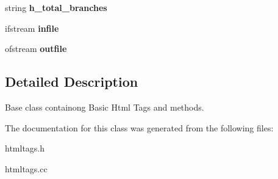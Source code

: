 \begin{DoxyCompactItemize}
\item 
\hypertarget{classHTMLTags_a71789f292e6d0dc11baa1e778bbb08c9}{string {\bfseries h\-\_\-total\-\_\-branches}}\label{classHTMLTags_a71789f292e6d0dc11baa1e778bbb08c9}

\item 
\hypertarget{classHTMLTags_ad72c63f88e720e8a23e457146d208578}{ifstream {\bfseries infile}}\label{classHTMLTags_ad72c63f88e720e8a23e457146d208578}

\item 
\hypertarget{classHTMLTags_a28fab1433a342a8862152c87959c03c3}{ofstream {\bfseries outfile}}\label{classHTMLTags_a28fab1433a342a8862152c87959c03c3}

\end{DoxyCompactItemize}


\subsection{Detailed Description}
Base class containong Basic Html Tags and methods. 

The documentation for this class was generated from the following files\-:\begin{DoxyCompactItemize}
\item 
htmltags.\-h\item 
htmltags.\-cc\end{DoxyCompactItemize}
